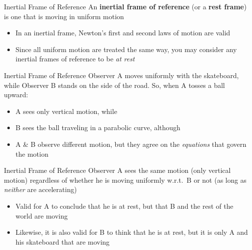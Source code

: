 \documentclass[12pt,compress,aspectratio=169]{beamer}
\begin{document}
\begin{frame}{Inertial Frame of Reference}
  An \textbf{inertial frame of reference} (or a \textbf{rest frame}) is one
  that is moving in uniform motion
  \begin{itemize}
  \item In an inertial frame, Newton's first and second laws of motion are valid
  \item Since all uniform motion are treated the same way, you may consider
    any inertial frames of reference to be \emph{at rest}
  \end{itemize}
  \vspace{.2in}
  \begin{center}
  \end{center}
\end{frame}



\begin{frame}{Inertial Frame of Reference}
  Observer A moves uniformly with the skateboard, while Observer B stands on
  the side of the road. So, when A tosses a ball upward:
  \begin{center}
  \end{center}
  \begin{itemize}
  \item A sees only vertical motion, while
  \item B sees the ball traveling in a parabolic curve, although
  \item A \& B observe different motion, but they agree on the \emph{equations}
    that govern the motion
  \end{itemize}
\end{frame}



\begin{frame}{Inertial Frame of Reference}
  Observer A sees the same motion (only vertical motion) regardless of whether
  he is moving uniformly w.r.t.\ B or not (as long as \emph{neither} are
  accelerating)
  \begin{center}
  \end{center}
  \begin{itemize}
  \item Valid for A to conclude that he is at rest, but that B and the rest of
    the world are moving
  \item Likewise, it is also valid for B to think that he is at rest, but it is
    only A and his skateboard that are moving
  \end{itemize}
\end{frame}
    
\end{document}
